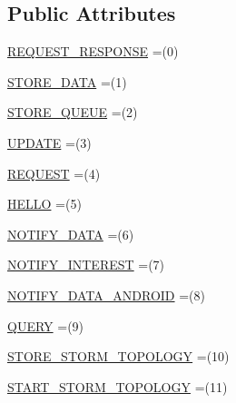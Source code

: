 \subsection*{Public Attributes}
\begin{DoxyCompactItemize}
\item 
\hyperlink{enumcom_1_1rutgers_1_1Core_1_1Message_1_1ARMessage_1_1Action_a719992da108e69e6c1e8d6e4c60f64ce}{R\+E\+Q\+U\+E\+S\+T\+\_\+\+R\+E\+S\+P\+O\+N\+SE} =(0)
\item 
\hyperlink{enumcom_1_1rutgers_1_1Core_1_1Message_1_1ARMessage_1_1Action_ae567d96b2da0bf1c9a52680ad6b1b326}{S\+T\+O\+R\+E\+\_\+\+D\+A\+TA} =(1)
\item 
\hyperlink{enumcom_1_1rutgers_1_1Core_1_1Message_1_1ARMessage_1_1Action_a50a0de74e6895487cf6a7bdfe2b93edf}{S\+T\+O\+R\+E\+\_\+\+Q\+U\+E\+UE} =(2)
\item 
\hyperlink{enumcom_1_1rutgers_1_1Core_1_1Message_1_1ARMessage_1_1Action_a4a41d82033c2f13b62ed7156a60964da}{U\+P\+D\+A\+TE} =(3)
\item 
\hyperlink{enumcom_1_1rutgers_1_1Core_1_1Message_1_1ARMessage_1_1Action_a2d2d358b05ef21e959ce4d9761b11d9d}{R\+E\+Q\+U\+E\+ST} =(4)
\item 
\hyperlink{enumcom_1_1rutgers_1_1Core_1_1Message_1_1ARMessage_1_1Action_a52ac2f66a541aa4d91b8342abd757f9f}{H\+E\+L\+LO} =(5)
\item 
\hyperlink{enumcom_1_1rutgers_1_1Core_1_1Message_1_1ARMessage_1_1Action_a0ce49899d634232b0a754124a2f9b0e2}{N\+O\+T\+I\+F\+Y\+\_\+\+D\+A\+TA} =(6)
\item 
\hyperlink{enumcom_1_1rutgers_1_1Core_1_1Message_1_1ARMessage_1_1Action_a9c65fafb97fc3a5bc241aaadb1a07be3}{N\+O\+T\+I\+F\+Y\+\_\+\+I\+N\+T\+E\+R\+E\+ST} =(7)
\item 
\hyperlink{enumcom_1_1rutgers_1_1Core_1_1Message_1_1ARMessage_1_1Action_a6f3add60da0d6c7c7f13de17c672ac58}{N\+O\+T\+I\+F\+Y\+\_\+\+D\+A\+T\+A\+\_\+\+A\+N\+D\+R\+O\+ID} =(8)
\item 
\hyperlink{enumcom_1_1rutgers_1_1Core_1_1Message_1_1ARMessage_1_1Action_ab178e9fd8808bcfbad408871083cceae}{Q\+U\+E\+RY} =(9)
\item 
\hyperlink{enumcom_1_1rutgers_1_1Core_1_1Message_1_1ARMessage_1_1Action_a9377377b2dfe52bd9703e546a9d18026}{S\+T\+O\+R\+E\+\_\+\+S\+T\+O\+R\+M\+\_\+\+T\+O\+P\+O\+L\+O\+GY} =(10)
\item 
\hyperlink{enumcom_1_1rutgers_1_1Core_1_1Message_1_1ARMessage_1_1Action_a896c8085aa2da84ad92214e06dde8ab0}{S\+T\+A\+R\+T\+\_\+\+S\+T\+O\+R\+M\+\_\+\+T\+O\+P\+O\+L\+O\+GY} =(11)

\end{DoxyCompactItemize}
